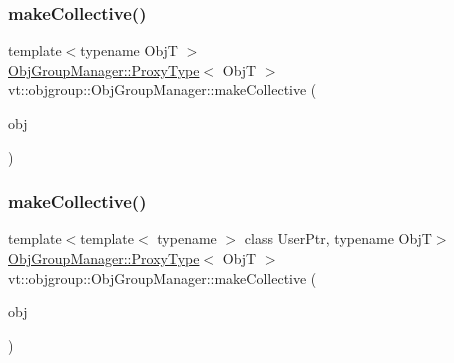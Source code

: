 \mbox{\label{structvt_1_1objgroup_1_1_obj_group_manager_a08fdc6029708edf1e3f7a4a66c998b99}} 
\subsubsection{\texorpdfstring{make\+Collective()}{makeCollective()}\hspace{0.1cm}{\footnotesize\ttfamily [4/5]}}
{\footnotesize\ttfamily template$<$typename ObjT $>$ \\
\hyperlink{structvt_1_1objgroup_1_1_obj_group_manager_aea65eef52f240a52210132eef5ce591f}{Obj\+Group\+Manager\+::\+Proxy\+Type}$<$ ObjT $>$ vt\+::objgroup\+::\+Obj\+Group\+Manager\+::make\+Collective (\begin{DoxyParamCaption}\item[{ObjT $\ast$}]{obj }\end{DoxyParamCaption})}

\mbox{\label{structvt_1_1objgroup_1_1_obj_group_manager_affb52495aa20a14b485ad3ba48234718}} 
\subsubsection{\texorpdfstring{make\+Collective()}{makeCollective()}\hspace{0.1cm}{\footnotesize\ttfamily [5/5]}}
{\footnotesize\ttfamily template$<$template$<$ typename $>$ class User\+Ptr, typename ObjT$>$ \\
\hyperlink{structvt_1_1objgroup_1_1_obj_group_manager_aea65eef52f240a52210132eef5ce591f}{Obj\+Group\+Manager\+::\+Proxy\+Type}$<$ ObjT $>$ vt\+::objgroup\+::\+Obj\+Group\+Manager\+::make\+Collective (\begin{DoxyParamCaption}\item[{User\+Ptr$<$ ObjT $>$}]{obj }\end{DoxyParamCaption})}

